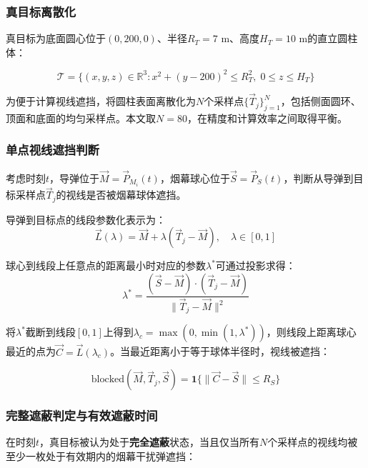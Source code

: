 \subsubsection{真目标离散化}

真目标为底面圆心位于$(0,200,0)$、半径$R_T = 7$ m、高度$H_T = 10$ m的直立圆柱体：

\begin{equation}
    \mathcal{T} = \{(x,y,z) \in \mathbb{R}^3 : x^2 + (y-200)^2 \le R_T^2,\; 0 \le z \le H_T\}
\end{equation}

为便于计算视线遮挡，将圆柱表面离散化为$N$个采样点$\{\vec{T}_j\}_{j=1}^{N}$，包括侧面圆环、顶面和底面的均匀采样点。本文取$N = 80$，在精度和计算效率之间取得平衡。

\subsubsection{单点视线遮挡判断}

考虑时刻$t$，导弹位于$\vec{M} = \vec{P}_{M_i}(t)$，烟幕球心位于$\vec{S} = \vec{P}_S(t)$，判断从导弹到目标采样点$\vec{T}_j$的视线是否被烟幕球体遮挡。

导弹到目标点的线段参数化表示为：
\begin{equation}
    \vec{L}(\lambda) = \vec{M} + \lambda(\vec{T}_j - \vec{M}),\quad \lambda \in [0, 1]
\end{equation}

球心到线段上任意点的距离最小时对应的参数$\lambda^*$可通过投影求得：
\begin{equation}
    \lambda^* = \frac{(\vec{S} - \vec{M}) \cdot (\vec{T}_j - \vec{M})}{\|\vec{T}_j - \vec{M}\|^2}
\end{equation}

将$\lambda^*$截断到线段$[0, 1]$上得到$\lambda_c = \max(0, \min(1, \lambda^*))$，则线段上距离球心最近的点为$\vec{C} = \vec{L}(\lambda_c)$。当最近距离小于等于球体半径时，视线被遮挡：

\begin{equation}
    \text{blocked}(\vec{M}, \vec{T}_j, \vec{S}) = \mathbf{1}\{\|\vec{C} - \vec{S}\| \le R_S\}
\end{equation}

\subsubsection{完整遮蔽判定与有效遮蔽时间}

在时刻$t$，真目标被认为处于\textbf{完全遮蔽}状态，当且仅当所有$N$个采样点的视线均被至少一枚处于有效期内的烟幕干扰弹遮挡：

